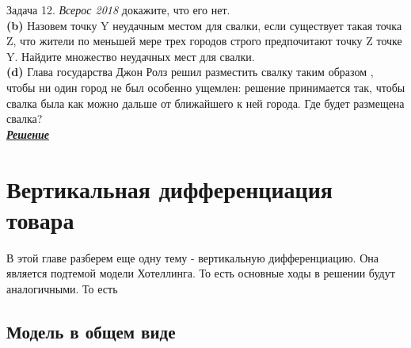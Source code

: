 \begin{mybox}{Задача 12. \textit{Всерос 2018}}
    докажите, что его нет.\smallskip\\
    \indent\setlength{\parindent}{1em}\textbf{(b)} Назовем точку Y неудачным местом для свалки, если существует такая
    точка Z, что жители по меньшей мере трех городов строго предпочитают точку Z точке Y. Найдите множество неудачных
    мест для свалки.\smallskip\\
    \indent\setlength{\parindent}{1em}\textbf{(d)} Глава государства Джон Ролз решил разместить свалку таким образом
    , чтобы ни один город не был особенно ущемлен: решение принимается так, чтобы свалка была как можно дальше от
    ближайшего к ней города. Где будет размещена свалка?\bigskip\\
    \textit{\textbf{\centering\href{https://iloveeconomics.ru/sites/default/files/olimp/vseros/2018/vseros_2018_vseros_10-11_klass_1_tur_resheniya_18405.pdf}{Решение}}}
\end{mybox}



\chapter{Вертикальная дифференциация товара}


\indent\setlength{\parindent}{1em}\indent\setlength{\parindent}{1em}В этой главе разберем еще одну тему - вертикальную
дифференциацию. Она является подтемой модели Хотеллинга. То есть основные ходы в решении будут аналогичными. То есть


\section{Модель в общем виде}

